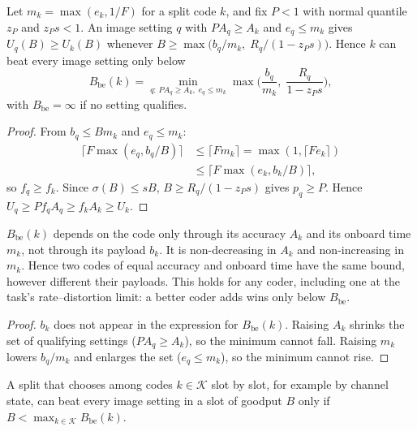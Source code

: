 \begin{proposition}\label{prop:be-family}
Let $m_k = \max(e_k, 1/F)$ for a split code $k$, and fix $P<1$ with normal quantile $z_P$ and $z_P s < 1$. An image
setting $q$ with $P A_q \ge A_k$ and $e_q \le m_k$ gives $U_q(B) \ge U_k(B)$ whenever
$B \ge \max\big(b_q/m_k,\; R_q/(1 - z_P s)\big)$. Hence $k$ can beat every image setting only below
\begin{equation*}
B_{\mathrm{be}}(k) = \min_{q:\,P A_q \ge A_k,\; e_q \le m_k} \max\Big(\frac{b_q}{m_k},\; \frac{R_q}{1 - z_P s}\Big),
\end{equation*}
with $B_{\mathrm{be}} = \infty$ if no setting qualifies.
\end{proposition}
\begin{proof}
From $b_q \le B m_k$ and $e_q \le m_k$:
\begin{align*}
\lceil F\max(e_q, b_q/B)\rceil &\le \lceil F m_k\rceil = \max(1, \lceil F e_k\rceil)\\
&\le \lceil F\max(e_k, b_k/B)\rceil ,
\end{align*}
so $f_q \ge f_k$. Since $\sigma(B) \le sB$, $B \ge R_q/(1 - z_P s)$ gives $p_q \ge P$. Hence
$U_q \ge P f_q A_q \ge f_k A_k \ge U_k$.
\end{proof}
\begin{corollary}\label{cor:coder}
$B_{\mathrm{be}}(k)$ depends on the code only through its accuracy $A_k$ and its onboard time $m_k$, not through its
payload $b_k$. It is non-decreasing in $A_k$ and non-increasing in $m_k$. Hence two codes of equal accuracy and
onboard time have the same bound, however different their payloads. This holds for any coder, including one at the
task's rate--distortion limit: a better coder adds wins only below $B_{\mathrm{be}}$.
\end{corollary}
\begin{proof}
$b_k$ does not appear in the expression for $B_{\mathrm{be}}(k)$. Raising $A_k$ shrinks the set of qualifying settings
($P A_q \ge A_k$), so the minimum cannot fall. Raising $m_k$ lowers $b_q/m_k$ and enlarges the set ($e_q \le m_k$),
so the minimum cannot rise.
\end{proof}
\begin{corollary}\label{cor:switch}
A split that chooses among codes $k \in \mathcal K$ slot by slot, for example by channel state, can beat every image
setting in a slot of goodput $B$ only if $B < \max_{k \in \mathcal K} B_{\mathrm{be}}(k)$.
\end{corollary}
